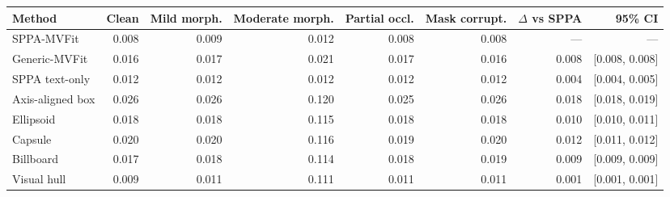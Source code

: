\begin{tabular}{@{}lrrrrrrr@{}}
\toprule
Method & Clean & Mild morph. & Moderate morph. & Partial occl. & Mask corrupt. & $\Delta$ vs SPPA & 95\% CI \\
\midrule
SPPA-MVFit & 0.008 & 0.009 & 0.012 & 0.008 & 0.008 & --- & --- \\
Generic-MVFit & 0.016 & 0.017 & 0.021 & 0.017 & 0.016 & 0.008 & [0.008, 0.008] \\
SPPA text-only & 0.012 & 0.012 & 0.012 & 0.012 & 0.012 & 0.004 & [0.004, 0.005] \\
Axis-aligned box & 0.026 & 0.026 & 0.120 & 0.025 & 0.026 & 0.018 & [0.018, 0.019] \\
Ellipsoid & 0.018 & 0.018 & 0.115 & 0.018 & 0.018 & 0.010 & [0.010, 0.011] \\
Capsule & 0.020 & 0.020 & 0.116 & 0.019 & 0.020 & 0.012 & [0.011, 0.012] \\
Billboard & 0.017 & 0.018 & 0.114 & 0.018 & 0.019 & 0.009 & [0.009, 0.009] \\
Visual hull & 0.009 & 0.011 & 0.111 & 0.011 & 0.011 & 0.001 & [0.001, 0.001] \\
\bottomrule
\end{tabular}

